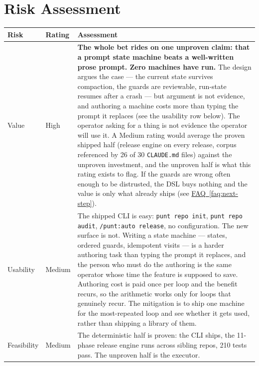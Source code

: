 \documentclass[11pt,letterpaper]{article}
\newcommand{\faqref}[1]{\hyperref[#1]{FAQ~\ref*{#1}}}
\begin{document}

\newpage
\section*{Risk Assessment}

\renewcommand{\arraystretch}{1.6}
\begin{tabularx}{\textwidth}{@{} l l X @{}}
\toprule
\textbf{\color{SectionBlue}Risk} & \textbf{\color{SectionBlue}Rating} & \textbf{\color{SectionBlue}Assessment} \\
\midrule
Value & \textcolor{RiskRed}{High} &
  \textbf{The whole bet rides on one unproven claim: that a prompt state
  machine beats a well-written prose prompt. Zero machines have run.} The
  design argues the case --- the current state survives compaction, the guards
  are reviewable, run-state resumes after a crash --- but argument is not
  evidence, and authoring a machine costs more than typing the prompt it
  replaces (see the usability row below). The operator asking for a thing is
  not evidence the operator will use it. A Medium rating would average the
  proven shipped half (release engine on every release, corpus referenced by 26
  of 30 \texttt{CLAUDE.md} files) against the unproven investment, and the
  unproven half is what this rating exists to flag. If the guards are wrong
  often enough to be distrusted, the DSL buys nothing and the value is only
  what already ships (see \faqref{faq:next-step}). \\
Usability & \textcolor{RiskAmber}{Medium} &
  The shipped CLI is easy: \texttt{punt repo init}, \texttt{punt repo audit},
  \texttt{/punt:auto release}, no configuration. The new surface is not.
  Writing a state machine --- states, ordered guards, idempotent visits --- is
  a harder authoring task than typing the prompt it replaces, and the person
  who must do the authoring is the same operator whose time the feature is
  supposed to save. Authoring cost is paid once per loop and the benefit
  recurs, so the arithmetic works only for loops that genuinely recur. The
  mitigation is to ship one machine for the most-repeated loop and see whether
  it gets used, rather than shipping a library of them. \\
Feasibility & \textcolor{RiskAmber}{Medium} &
  The deterministic half is proven: the CLI ships, the 11-phase release engine
  runs across sibling repos, 210 tests pass. The unproven half is the executor.

\end{tabularx}
\end{document}
